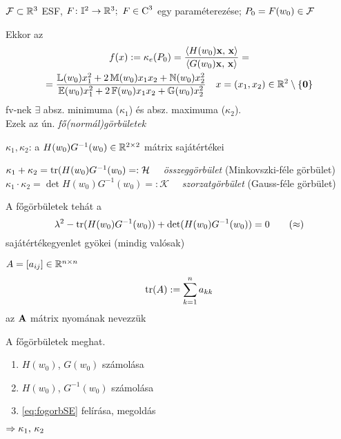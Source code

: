 \begin{te}[Főgörbületekre]
  $\mathcal F\subset\mathbb{R}^3$ ESF, $F\colon \mathbb I^2\to\mathbb{R}^3;\ F\in \operatorname{C}^3$ egy paraméterezése; $P_0=F(w_0)\in\mathcal F$
  \begin{enumzjr}
  \item Ekkor az
    \begin{gather*}
      f(x):= \kappa_e(P_0) = \dfrac{\langle H(w_0)\mathbf{x},\,\mathbf{x}\rangle}{\langle G(w_0)\mathbf{x},\,\mathbf{x}\rangle} = \\
      = \dfrac{\mathbb L(w_0)x_1^2 + 2\,\mathbb M(w_0)x_1x_2 + \mathbb N(w_0)x_2^2}{\mathbb E(w_0)x_1^2 + 2\,\mathbb F(w_0)x_1x_2 + \mathbb G(w_0)x_2^2}
      \quad x=(x_1,x_2)\in\mathbb{R}^2\setminus\{\mathbf{0}\}
    \end{gather*}
    fv-nek $\exists$ absz. minimuma ($\kappa_1$) és absz. maximuma ($\kappa_2$).\\Ezek az ún. \emph{fő(normál)görbületek}
  \item $\kappa_1, \kappa_2$: a $H(w_0)G^{-1}(w_0) \in\mathbb{R}^{2\times2}$ mátrix sajátértékei
  \item $\kappa_1+\kappa_2 = \operatorname{tr}(H(w_0) G^{-1}(w_0) =: \mathcal{H}\quad $ \emph{összeggörbület} (Minkovszki-féle görbület)\\
    $\kappa_1\cdot\kappa_2 = \det{H(w_0) G^{-1}(w_0)} =: \mathcal{K}\quad $ \emph{szorzatgörbület} (Gauss-féle görbület)
    
  \item A főgörbületek tehát a
    \[ \lambda^2 - \operatorname{tr}(H(w_0)G^{-1}(w_0)) + \det(H(w_0)G^{-1}(w_0)) = 0 \tag{$\approx$}\label{eq:fogorbSE}\]
    sajátértékegyenlet gyökei (mindig valósak)
  \end{enumzjr}  
\end{te}

\begin{te}
  $A=[a_{ij}]\in\mathbb{R}^{n\times n}$
  \[ \operatorname{tr}(A) := \sum_{k=1}^n a_{kk}\]
  az $\mathbf{A}$ mátrix nyomának nevezzük
\end{te}

\begin{megj}
  A főgörbületek meghat.
  \begin{enumerate}
    \item $H(w_0)$, $G(w_0)$ számolása
    \item $H(w_0)$, $G^{-1}(w_0)$ számolása
    \item \eqref{eq:fogorbSE} felírása, megoldás
  \end{enumerate}
  $\Rightarrow \kappa_1,\,\kappa_2$
\end{megj}


